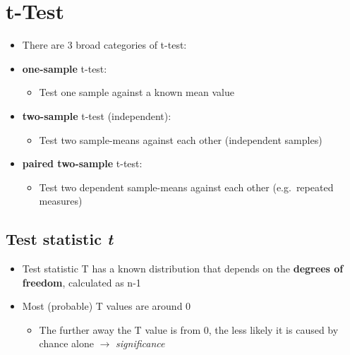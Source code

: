 \documentclass[
]{book}
\providecommand{\tightlist}{%
  \setlength{\itemsep}{0pt}\setlength{\parskip}{0pt}}
\begin{document}
\section{t-Test}\label{t-test}

\begin{itemize}
\item
  There are 3 broad categories of t-test:
\item
  \textbf{one-sample} t-test:

  \begin{itemize}
  \tightlist
  \item
    Test one sample against a known mean value
  \end{itemize}
\item
  \textbf{two-sample} t-test (independent):

  \begin{itemize}
  \tightlist
  \item
    Test two sample-means against each other (independent samples)
  \end{itemize}
\item
  \textbf{paired two-sample} t-test:

  \begin{itemize}
  \tightlist
  \item
    Test two dependent sample-means against each other (e.g.~repeated measures)
  \end{itemize}
\end{itemize}

\subsection{\texorpdfstring{Test statistic \emph{t}}{Test statistic t}}\label{test-statistic-t}

\begin{itemize}
\tightlist
\item
  Test statistic T has a known distribution that depends on the \textbf{degrees of freedom}, calculated as n-1
\item
  Most (probable) T values are around 0

  \begin{itemize}
  \tightlist
  \item
    The further away the T value is from 0, the less likely it is caused by chance alone \(\rightarrow\) \emph{significance}
  \end{itemize}
\end{itemize}
\end{document}

